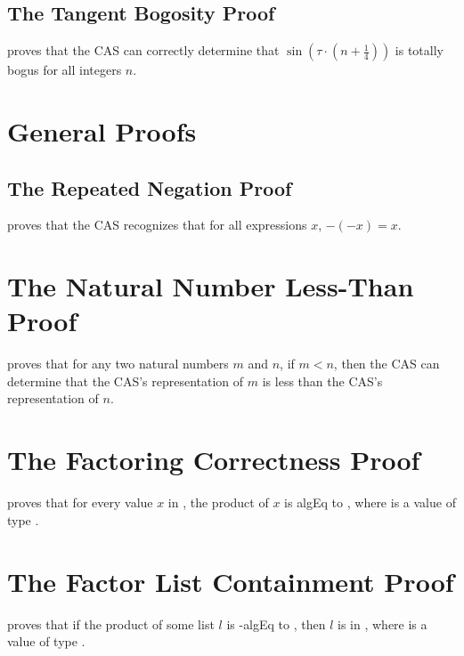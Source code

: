 \documentclass{report}
\begin{document}
\subsection{The Tangent Bogosity Proof}
  proves that the  CAS can correctly determine that \(\sin \left(\tau \cdot \left(n + \frac{1}{4}\right)\right)\) is totally bogus for all integers \(n\).

\section{General Proofs}

\subsection{The Repeated Negation Proof}
  proves that the  CAS recognizes that for all expressions \(x\), \(- \left(- x\right) = x\).

\section{The Natural Number Less-Than Proof}
  proves that for any two natural numbers \(m\) and \(n\), if \(m < n\), then the  CAS can determine that the  CAS's representation of \(m\) is less than the  CAS's representation of \(n\).

\section{The Factoring Correctness Proof}
  proves that for every value \(x\) in   , the product of \(x\) is \gls{algEq} to , where  is a value of type  .

\section{The Factor List Containment Proof}
  proves that if the product of some list \(l\) is -\gls{algEq} to , then \(l\) is in   , where  is a value of type  .
\end{document}
